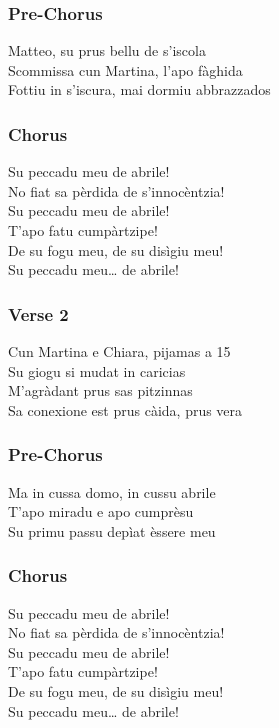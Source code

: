 \subsubsection{Pre-Chorus}\label{pre-chorus-55}

Matteo, su prus bellu de s'iscola\\
Scommissa cun Martina, l'apo fàghida\\
Fottiu in s'iscura, mai dormiu abbrazzados

\subsubsection{Chorus}\label{chorus-72}

Su peccadu meu de abrile!\\
No fiat sa pèrdida de s'innocèntzia!\\
Su peccadu meu de abrile!\\
T'apo fatu cumpàrtzipe!\\
De su fogu meu, de su disìgiu meu!\\
Su peccadu meu\ldots{} de abrile!

\subsubsection{Verse 2}\label{verse-2-23}

Cun Martina e Chiara, pijamas a 15\\
Su giogu si mudat in caricias\\
M'agràdant prus sas pitzinnas\\
Sa conexione est prus càida, prus vera

\subsubsection{Pre-Chorus}\label{pre-chorus-56}

Ma in cussa domo, in cussu abrile\\
T'apo miradu e apo cumprèsu\\
Su primu passu depìat èssere meu

\subsubsection{Chorus}\label{chorus-73}

Su peccadu meu de abrile!\\
No fiat sa pèrdida de s'innocèntzia!\\
Su peccadu meu de abrile!\\
T'apo fatu cumpàrtzipe!\\
De su fogu meu, de su disìgiu meu!\\
Su peccadu meu\ldots{} de abrile!

